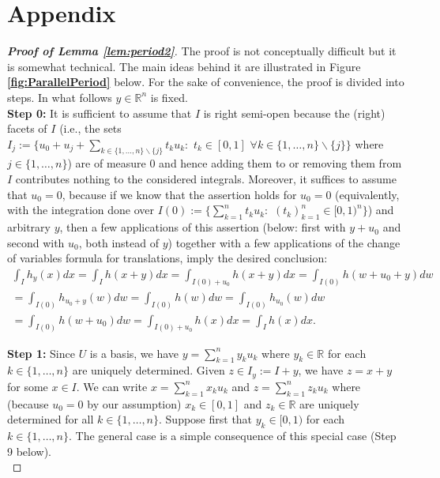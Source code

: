 \documentclass[12 pt]{amsart}
\theoremstyle{definition}
\newcommand{\R}{\mathbb{R}}
\newcommand{\bref}[1]{\textbf{\ref{#1}}} %
\begin{document}
\section{Appendix}\label{sec:Appendix}
\begin{proof}[{\bf Proof of Lemma \bref{lem:period2}}]
The proof is not conceptually difficult but it is somewhat technical. The main ideas behind it are illustrated in Figure \bref{fig:ParallelPeriod} below. For the sake of convenience, the proof is divided into steps. In what follows $y\in\R^n$ is fixed. \\

{\noindent \bf Step 0:} It is sufficient to assume that $I$ is right semi-open because the (right) facets of $I$ (i.e., the sets $I_j:=\{u_0+u_j+\sum_{k\in\{1,\ldots,n\}\backslash\{j\}} t_k u_k:\,\,t_k\in [0,1]\,\,\forall k\in\{1,\ldots,n\}\backslash\{j\}\}$ where $j\in\{1,\ldots,n\}$) are of measure 0 and hence adding them to or removing them from $I$ contributes nothing to the considered integrals. Moreover, it suffices to assume that $u_0=0$, because if we know that  the assertion holds for $u_0=0$ (equivalently, with the integration done over $I(0):=\{\sum_{k=1}^n t_k u_k:\,\,(t_k)_{k=1}^n\in [0,1)^n\}$) and arbitrary $y$, then a few applications of this assertion (below: first with $y+u_0$ and second with $u_0$, both instead of $y$) together with a few applications of the  change of variables formula for translations, imply the desired conclusion: 
\begin{multline*} \int_{I}h_y(x)dx=\int_{I}h(x+y)dx=\int_{I(0)+u_0}h(x+y)dx
=\int_{I(0)}h(w+u_0+y)dw\\
=\int_{I(0)}h_{u_0+y}(w)dw=\int_{I(0)}h(w)dw=\int_{I(0)}h_{u_0}(w)dw\\
=\int_{I(0)}h(w+u_0)dw=\int_{I(0)+u_0}h(x)dx=\int_{I}h(x)dx.
\end{multline*}

{\noindent \bf Step 1:} Since $U$ is a basis, we have $y=\sum_{k=1}^n y_k u_k$ where $y_k\in \R$ for each $k\in\{1,\ldots,n\}$ are uniquely determined. Given $z\in I_y:=I+y$, we have $z=x+y$ for some $x\in I$. We can write $x=\sum_{k=1}^n x_k u_k$ and $z=\sum_{k=1}^n z_k u_k$ where (because $u_0=0$ by our assumption)  $x_k\in [0,1]$ and $z_k\in\R$ are uniquely determined for all $k\in\{1,\ldots,n\}$. Suppose first that $y_k\in [0,1)$ for each $k\in\{1,\ldots,n\}$. The general case is a simple consequence of this special case (Step 9  below).\\



\end{proof}
\end{document}
